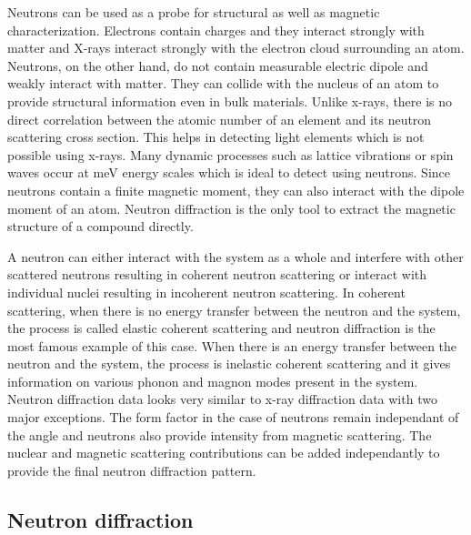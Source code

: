 \documentclass[letterpaper,10pt,doublespacing,edeposit]{uiucthesis2020}
\begin{document}
\begin{mainmatter}
Neutrons can be used as a probe for structural as well as magnetic characterization. Electrons contain charges and they interact strongly with matter and X-rays interact strongly with the electron cloud surrounding an atom. Neutrons, on the other hand, do not contain measurable electric dipole and weakly interact with matter. They can collide with the nucleus of an atom to provide structural information even in bulk materials. Unlike x-rays, there is no direct correlation between the atomic number of an element and its neutron scattering cross section. This helps in detecting light elements which is not possible using x-rays. Many dynamic processes such as lattice vibrations or spin waves occur at meV energy scales which is ideal to detect using neutrons. Since neutrons contain a finite magnetic moment, they can also interact with the dipole moment of an atom. Neutron diffraction is the only tool to extract the magnetic structure of a compound directly.

A neutron can either interact with the system as a whole and interfere with other scattered neutrons resulting in coherent neutron scattering or interact with individual nuclei resulting in incoherent neutron scattering. In coherent scattering, when there is no energy transfer between the neutron and the system, the process is called elastic coherent scattering and neutron diffraction is the most famous example of this case. When there is an energy transfer between the neutron and the system, the process is inelastic coherent scattering and it gives information on various phonon and magnon modes present in the system. Neutron diffraction data looks very similar to x-ray diffraction data with two major exceptions. The form factor in the case of neutrons remain independant of the angle and neutrons also provide intensity from magnetic scattering. The nuclear and magnetic scattering contributions can be added independantly to provide the final neutron diffraction pattern.

\subsection{Neutron diffraction}



\end{mainmatter}
\end{document}
